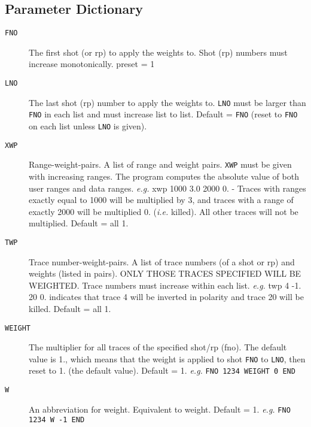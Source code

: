 \subsection{Parameter Dictionary}
\begin{description}

\item[\texttt{FNO}] The first \gls{shot} (or \gls{rp}) to apply the weights to.  Shot (\gls{rp})
         numbers must increase monotonically.
         \Gls{preset} = 1

\item[\texttt{LNO}] The last \gls{shot} (\gls{rp}) number to apply the weights to.  \texttt{LNO} must be
         larger than \texttt{FNO} in each list and must increase list to list.
         Default = \texttt{FNO}  (reset to \texttt{FNO} on each list unless \texttt{LNO} is given).

\item[\texttt{XWP}] Range-weight-pairs.  A list of range and weight pairs.  \texttt{XWP}
         must be given with increasing ranges.  The program computes the
         absolute value of both user ranges and data ranges.
         \textit{e.g.} xwp 1000 3.0 2000 0. - Traces with ranges exactly equal to
         1000 will be multiplied by 3, and traces with a range of
         exactly 2000 will be multiplied 0. (\textit{i.e.} killed).  All other
         traces will not be multiplied.
         Default = all 1.

\item[\texttt{TWP}] Trace number-weight-pairs. A list of trace numbers (of a \gls{shot}
         or \gls{rp}) and weights (listed in pairs).  ONLY THOSE TRACES
         SPECIFIED WILL BE WEIGHTED.  Trace numbers must increase
         within each list.   \textit{e.g.}  twp 4 -1. 20 0. indicates that trace
         4 will be inverted in polarity and trace 20 will be killed.
         Default = all 1.

\item[\texttt{WEIGHT}] The multiplier for all traces of the specified \gls{shot}/\gls{rp} (fno).
         The default value is 1., which means that the weight is applied
         to \gls{shot} \texttt{FNO} to \texttt{LNO}, then reset to 1. (the default value).
         Default = 1.             \textit{e.g.}    \texttt{FNO 1234 WEIGHT 0 END}

\item[\texttt{W}] An abbreviation for weight.  Equivalent to weight.
         Default = 1.       \textit{e.g.} \texttt{FNO 1234 W -1 END}


\end{description}
